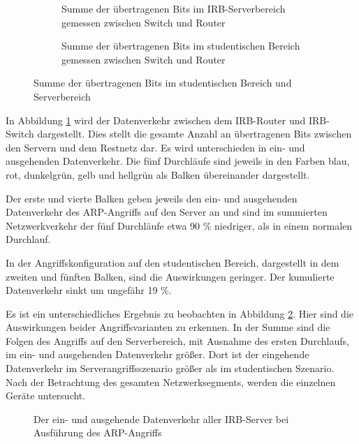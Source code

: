 \begin{figure}[ht]
	\centering 
	\begin{subfigure}{0.45\textwidth}
		
		\caption[Übertragene Bits im IRB-Serverbereich]{Summe der übertragenen Bits im IRB-Serverbereich gemessen zwischen Switch und Router}
		\label{fig:arpBitIrb}
	\end{subfigure}
	\hfil
	\begin{subfigure}{0.45\textwidth}
		
		\caption[Übertragene Bits im studentischen Bereich]{Summe der übertragenen Bits im studentischen Bereich gemessen zwischen Switch und Router}
		\label{fig:arpBitStudenten}
	\end{subfigure}
	\label{fig:arpBits}
	\caption[Übertragene Bits des ARP-Angriffs]{Summe der übertragenen Bits im studentischen Bereich und Serverbereich}
\end{figure}

In Abbildung \ref{fig:arpBitIrb} wird der Datenverkehr zwischen dem IRB-Router und IRB-Switch dargestellt. Dies stellt die gesamte Anzahl an übertragenen Bits zwischen den Servern und dem Restnetz dar. Es wird unterschieden in ein- und ausgehenden Datenverkehr. Die fünf Durchläufe sind jeweils in den Farben blau, rot, dunkelgrün, gelb und hellgrün als Balken übereinander dargestellt. 

Der erste und vierte Balken geben jeweils den ein- und ausgehenden Datenverkehr des ARP-Angriffs auf den Server an und sind im summierten Netzwerkverkehr der fünf Durchläufe etwa 90 \% niedriger, als in einem normalen Durchlauf.

In der Angriffskonfiguration auf den studentischen Bereich, dargestellt in dem zweiten und fünften Balken, sind die Auswirkungen geringer. Der kumulierte Datenverkehr sinkt um ungefähr 19 \%. 

Es ist ein unterschiedliches Ergebnis zu beobachten in Abbildung \ref{fig:arpBitStudenten}. Hier sind die Auswirkungen beider Angriffsvarianten zu erkennen. In der Summe sind die Folgen des Angriffs auf den Serverbereich, mit Ausnahme des ersten Durchlaufs, im ein- und ausgehenden Datenverkehr größer. Dort ist der eingehende Datenverkehr im Serverangriffsszenario größer als im studentischen Szenario. Nach der Betrachtung des gesamten Netzwerksegments, werden die einzelnen Geräte untersucht.

\begin{figure}[ht]
	\centering
	 
	\caption[IRB-Server-Datenverkehr mit ARP-Angriff]{Der ein- und ausgehende Datenverkehr aller IRB-Server bei Ausführung des ARP-Angriffs }
	\label{fig:arpIrbBitsOverview}
\end{figure}

